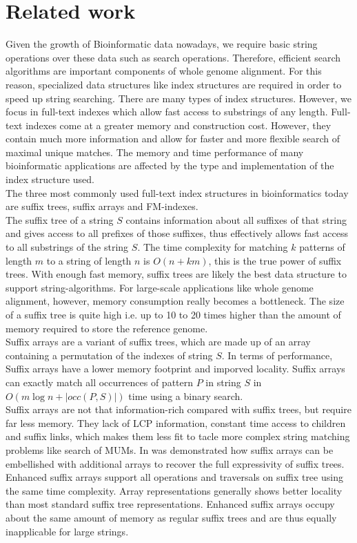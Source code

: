 \documentclass[runningheads,a4paper]{llncs}
\begin{document}
\section{Related work}
Given the growth of Bioinformatic data nowadays, we require basic string operations over these data such as search operations. Therefore, efficient search algorithms are important components of whole genome alignment. For this reason, specialized data structures like index structures are required in order to speed up string searching. There are many types of index structures. However, we focus in full-text indexes which allow fast access to substrings of any length. Full-text indexes come at a greater memory and construction cost. However, they contain much more information and allow for faster and more flexible search of maximal unique matches. The memory and time performance of many bioinformatic applications are affected by the type and implementation of the index structure used.\\
The three most commonly used full-text index structures in bioinformatics today are suffix trees, suffix arrays and FM-indexes.\\
The suffix tree of a string $S$ contains information about all suffixes of that string and gives access to all prefixes of those suffixes, thus effectively allows fast access to all substrings of the string $S$. The time complexity for matching $k$ patterns of length $m$ to a string of length $n$ is $O(n+km)$, this is the true power of suffix trees. With enough fast memory, suffix trees are likely the best data structure to support string-algorithms. For large-scale applications like whole genome alignment, however, memory consumption really becomes a bottleneck. The size of a suffix tree is quite high i.e. up to 10 \cite{lazy} to 20 times \cite{kurtz} higher than the amount of memory required to store the reference genome.\\
Suffix arrays \cite{sa} are a variant of suffix trees, which are made up of an array containing a permutation of the indexes of string $S$. In terms of performance, Suffix arrays have a lower memory footprint and imporved locality. Suffix arrays can exactly match all occurrences of pattern $P$ in string $S$ in $O(m\log n+|occ(P,S)|)$ time using a binary search.\\
Suffix arrays are not that information-rich compared with suffix trees, but require far less memory. They lack of LCP information, constant time access to children and suffix links, which makes them less fit to tacle more complex string matching problems like search of MUMs. In \cite{abouelhoda} was demonstrated how suffix arrays can be embellished with additional arrays to recover the full expressivity of suffix trees. Enhanced suffix arrays support all operations and traversals on suffix tree using the same time complexity. Array representations generally shows better locality than most standard suffix tree representations. Enhanced suffix arrays occupy about the same amount of memory as regular suffix trees  and are thus equally inapplicable for large strings.\\
\end{document}
